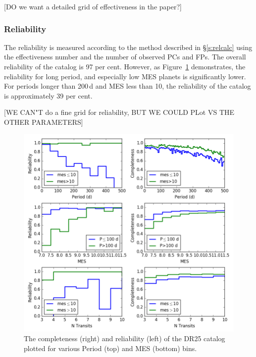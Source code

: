 [DO we want a detailed grid of effectiveness in the paper?]

\subsubsection{Reliability}
The reliability is measured according to the method described in \S\ref{s:relcalc} using the effectiveness number and the number of observed PCs and FPs.  The overall reliability of the catalog is 97 per cent. However, as Figure~\ref{f:1dcompare} demonstrates, the reliability for long period, and especially low MES planets is significantly lower.  For periods longer than 200\,d and MES less than 10, the reliability of the catalog is approximately 39 per cent.

[WE CAN"T do a fine grid for reliability, BUT WE COULD PLot VS THE  OTHER PARAMETERS]

\begin{figure}[h!]
 \begin{center}
  \includegraphics[width=1.0\linewidth]{fig-compRel1D-PerMes.png}
  \caption{ The completeness (right) and reliability (left) of the DR25 catalog plotted for various Period (top) and MES (bottom) bins.}
  \label{f:1dcompare}
 \end{center}
 \end{figure}




